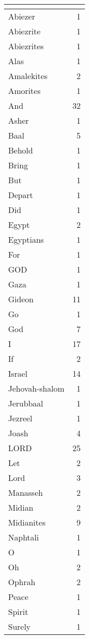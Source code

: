 \begin{center}
\begin{longtable}{l|r}
\hline \multicolumn{2}{c}{{ }} \\ \hline
\endfoot 
Abiezer & 1\\ \hline 
Abiezrite & 1\\ \hline 
Abiezrites & 1\\ \hline 
Alas & 1\\ \hline 
Amalekites & 2\\ \hline 
Amorites & 1\\ \hline 
And & 32\\ \hline 
Asher & 1\\ \hline 
Baal & 5\\ \hline 
Behold & 1\\ \hline 
Bring & 1\\ \hline 
But & 1\\ \hline 
Depart & 1\\ \hline 
Did & 1\\ \hline 
Egypt & 2\\ \hline 
Egyptians & 1\\ \hline 
For & 1\\ \hline 
GOD & 1\\ \hline 
Gaza & 1\\ \hline 
Gideon & 11\\ \hline 
Go & 1\\ \hline 
God & 7\\ \hline 
I & 17\\ \hline 
If & 2\\ \hline 
Israel & 14\\ \hline 
Jehovah-shalom & 1\\ \hline 
Jerubbaal & 1\\ \hline 
Jezreel & 1\\ \hline 
Joash & 4\\ \hline 
LORD & 25\\ \hline 
Let & 2\\ \hline 
Lord & 3\\ \hline 
Manasseh & 2\\ \hline 
Midian & 2\\ \hline 
Midianites & 9\\ \hline 
Naphtali & 1\\ \hline 
O & 1\\ \hline 
Oh & 2\\ \hline 
Ophrah & 2\\ \hline 
Peace & 1\\ \hline 
Spirit & 1\\ \hline 
Surely & 1\\ \hline 

\end{longtable}
\end{center}
